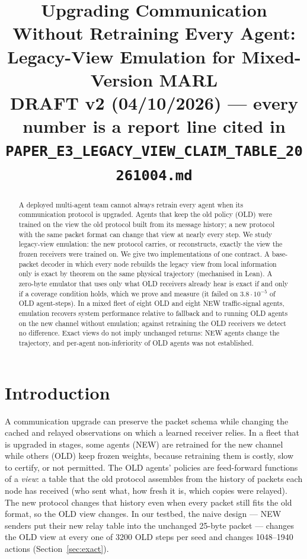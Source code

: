 \documentclass[11pt]{article}
\title{Upgrading Communication Without Retraining Every Agent:\\ Legacy-View Emulation for Mixed-Version MARL\\[4pt]
\large DRAFT v2 (04/10/2026) --- every number is a report line cited in \texttt{PAPER\_E3\_LEGACY\_VIEW\_CLAIM\_TABLE\_20261004.md}}
\date{}
\begin{document}
\maketitle

\begin{abstract}
A deployed multi-agent team cannot always retrain every agent when its communication protocol is upgraded. Agents that keep the old
policy (OLD) were trained on the view the old protocol built from its message history; a new protocol with the same packet format can
change that view at nearly every step. We study legacy-view emulation: the new protocol carries, or reconstructs, exactly the view the
frozen receivers were trained on. We give two implementations of one contract. A base-packet decoder in which every node rebuilds the
legacy view from local information only is exact by theorem on the same physical trajectory (mechanised in Lean). A zero-byte emulator
that uses only what OLD receivers already hear is exact if and only if a coverage condition holds, which we prove and measure (it failed
on $3.8\cdot10^{-5}$ of OLD agent-steps). In a mixed fleet of eight OLD and eight NEW traffic-signal agents, emulation recovers system
performance relative to fallback and to running OLD agents on the new channel without emulation; against retraining the OLD receivers
we detect no difference. Exact views do not imply unchanged returns: NEW agents change the trajectory, and per-agent non-inferiority of
OLD agents was not established.
\end{abstract}

\section{Introduction}
A communication upgrade can preserve the packet schema while changing the cached and relayed observations on which a learned receiver
relies. In a fleet that is upgraded in stages, some agents (NEW) are retrained for the new channel while others (OLD) keep frozen
weights, because retraining them is costly, slow to certify, or not permitted. The OLD agents' policies are feed-forward functions of a
\emph{view}: a table that the old protocol assembles from the history of packets each node has received (who sent what, how fresh it is,
which copies were relayed). The new protocol changes that history even when every packet still fits the old format, so the OLD view
changes. In our testbed, the naive design --- NEW senders put their new relay table into the unchanged 25-byte packet --- changes the OLD
view at every one of 3200 OLD steps per seed and changes 1048--1940 actions (Section~\ref{sec:exact}).
\end{document}
